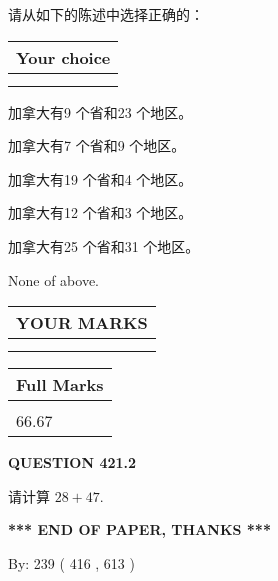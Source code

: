 \documentclass{ctexart}
\begin{document}
  
请从如下的陈述中选择正确的：
  
  
\noindent\hspace{3.0in} \begin{tabular}{|l|}
\hline
Your choice \\
\hline
 \\ 
 \\ 
\hline
\end{tabular}
  
  
 
 
加拿大有9 个省和23 个地区。
 
 
加拿大有7 个省和9 个地区。
 
 
加拿大有19 个省和4 个地区。
 
 
加拿大有12 个省和3 个地区。
 
 
加拿大有25 个省和31 个地区。
 
 
 None of above.
 
 
  
\vspace{0.2in}
  
\noindent\begin{tabular}{|l|}
\hline
 YOUR MARKS  \\
\hline
 \\ 
 \\ 
\hline
\end{tabular}
\hspace{0.05in} \begin{tabular}{|l|}
\hline
 Full Marks  \\
\hline
 \\ 
66.67 \\
\hline
\end{tabular}
{\textbf{\Large{QUESTION
421.2 
}}}
  
  
 
请计算 $ %
28 +  %
47 $.
 

 

 
   
   
 \vspace{0.2in}
 
   
   
   
   
\vspace{1.0in} 
{\textbf{\large{ *** END OF PAPER, THANKS *** }}} 
   
   
\hspace{1.0in} By: 
 239 ( 416 ,  613 )
   
\end{document}
